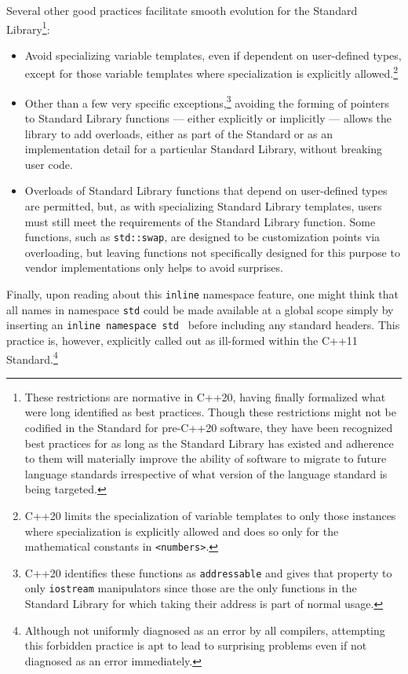 Several other good practices facilitate smooth evolution for the
Standard Library{\cprotect\footnote{These restrictions are normative in
C++20, having finally formalized what were long identified as best
practices. Though these restrictions might not be codified in the
Standard for pre-C++20 software, they have been recognized best
practices for as long as the Standard Library has existed and
adherence to them will materially improve the ability of software to
migrate to future language standards irrespective of what version of
  the language standard is being targeted.}}:
\begin{itemize}
\item{Avoid specializing variable templates, even if dependent on user-defined types, except for those variable templates where specialization is explicitly allowed.\cprotect\footnote{C++20 limits the specialization of variable templates to only those instances where specialization is explicitly allowed and does so only for the mathematical constants in \texttt{<numbers>}.}}
\item{Other than a few very specific exceptions,\cprotect\footnote{C++20 identifies these functions as \texttt{addressable} and gives that property to only \texttt{iostream} manipulators since those are the only functions in the Standard Library for which taking their address is part of normal usage.} avoiding the forming of pointers to Standard Library functions — either explicitly or implicitly — allows the library to add overloads, either as part of the Standard or as an implementation detail for a particular Standard Library, without breaking user code.}
\item{Overloads of Standard Library functions that depend on user-defined types are permitted, but, as with specializing Standard Library templates, users must still meet the requirements of the Standard Library function. Some functions, such as \texttt{std::swap}, are designed to be customization points via overloading, but leaving functions not specifically designed for this purpose to vendor implementations only helps to avoid surprises.}
\end{itemize}

Finally, upon reading about this \texttt{inline} namespace feature, one
might think that all names in namespace \texttt{std} could be made
available at a global scope simply by inserting an
\texttt{inline}~\texttt{namespace}~\texttt{std}~\texttt{{}} before
including any standard headers. This practice is, however, explicitly
called out as ill-formed within the C++11 Standard.\footnote{Although not uniformly diagnosed as an error by
all compilers, attempting this forbidden practice is apt to lead to
surprising problems even if not diagnosed as an error immediately.}


